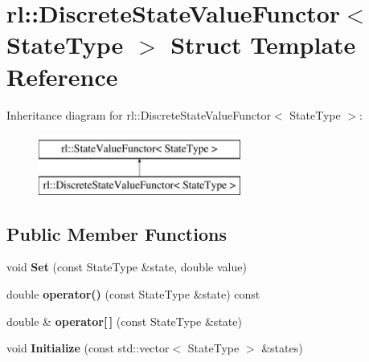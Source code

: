 \hypertarget{structrl_1_1_discrete_state_value_functor}{}\section{rl\+:\+:Discrete\+State\+Value\+Functor$<$ State\+Type $>$ Struct Template Reference}
\label{structrl_1_1_discrete_state_value_functor}
Inheritance diagram for rl\+:\+:Discrete\+State\+Value\+Functor$<$ State\+Type $>$\+:\begin{figure}[H]
\begin{center}
\leavevmode
\includegraphics[height=2.000000cm]{structrl_1_1_discrete_state_value_functor}
\end{center}
\end{figure}
\subsection*{Public Member Functions}
\begin{DoxyCompactItemize}
\item 
\hypertarget{structrl_1_1_discrete_state_value_functor_a601e7ddfddf03e0bcef64ee855c89c80}{}\label{structrl_1_1_discrete_state_value_functor_a601e7ddfddf03e0bcef64ee855c89c80} 
void {\bfseries Set} (const State\+Type \&state, double value)
\item 
\hypertarget{structrl_1_1_discrete_state_value_functor_a63bf8449ed047b82326242424b8f1ef1}{}\label{structrl_1_1_discrete_state_value_functor_a63bf8449ed047b82326242424b8f1ef1} 
double {\bfseries operator()} (const State\+Type \&state) const
\item 
\hypertarget{structrl_1_1_discrete_state_value_functor_a6763e866eb6edad1a1b636dd75e15e99}{}\label{structrl_1_1_discrete_state_value_functor_a6763e866eb6edad1a1b636dd75e15e99} 
double \& {\bfseries operator\mbox{[}$\,$\mbox{]}} (const State\+Type \&state)
\item 
\hypertarget{structrl_1_1_discrete_state_value_functor_ac2c27101c79091445466bb4f3e5239c5}{}\label{structrl_1_1_discrete_state_value_functor_ac2c27101c79091445466bb4f3e5239c5} 
void {\bfseries Initialize} (const std\+::vector$<$ State\+Type $>$ \&states)
\end{DoxyCompactItemize}
